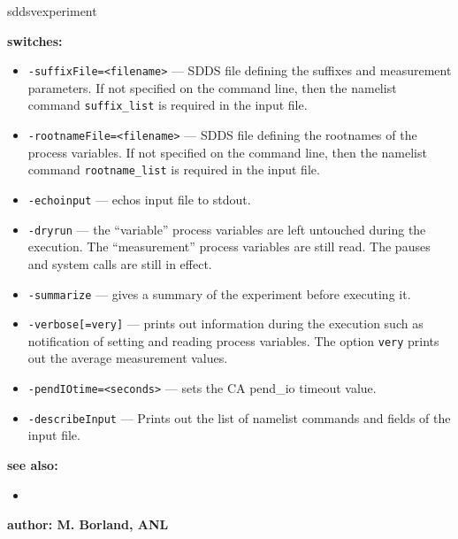 \begin{sddsprog}{sddsvexperiment}
\item {\bf switches:}
%
%
   \begin{itemize}
   \item {\verb+-suffixFile=<filename>+} --- SDDS file defining the suffixes and measurement parameters. If not specified
               on the command line, then the namelist command {\verb+suffix_list+} is required in the input file.
   \item {\verb+-rootnameFile=<filename>+} --- SDDS file defining the rootnames of the process variables. If not specified
               on the command line, then the namelist command {\verb+rootname_list+} is required in the input file.
    \item {\verb+-echoinput+} --- echos input file to stdout.
    \item {\verb+-dryrun+} --- the ``variable'' process variables are left untouched during the execution. The ``measurement''
                process variables are still read. The pauses and system calls are still in effect.
    \item {\verb+-summarize+} --- gives a summary of the experiment before executing it.
    \item {\verb+-verbose[=very]+} --- prints out information during the execution such as notification of
                setting and reading process variables.  The option \verb+very+ prints out the average measurement values.
    \item {\verb+-pendIOtime=<seconds>+} --- sets the CA pend\_io timeout value.
    \item {\verb+-describeInput+} --- Prints out the list of namelist commands and fields of the input file.
   \end{itemize}

\item {\bf see also:}
    \begin{itemize}
%
%
    \item {}
    \end{itemize}
%
%
\item {\bf author: M. Borland, ANL} 
\end{sddsprog}
